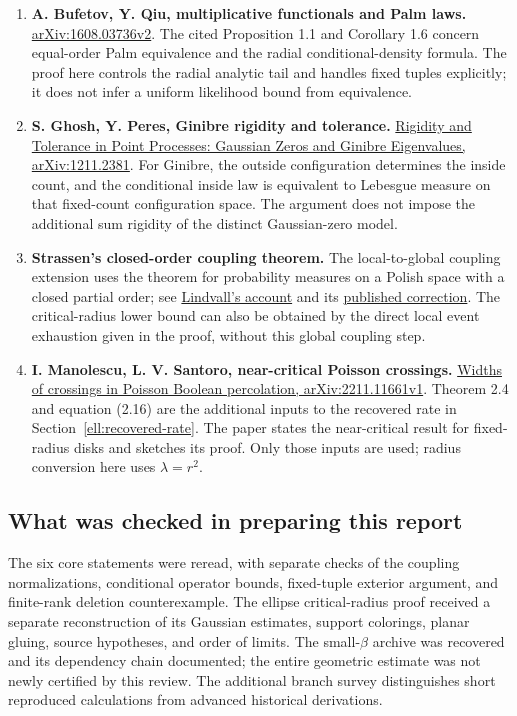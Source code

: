 \documentclass[11pt,a4paper]{article}
\theoremstyle{definition}
\theoremstyle{remark}
\numberwithin{equation}{section}
\begin{document}
\begin{enumerate}[leftmargin=*]
\item \textbf{A. Bufetov, Y. Qiu, multiplicative functionals and Palm laws.}
\href{https://arxiv.org/html/1608.03736v2}{arXiv:1608.03736v2}.
The cited Proposition 1.1 and Corollary 1.6 concern equal-order Palm
equivalence and the radial conditional-density formula. The proof here
controls the radial analytic tail and handles fixed tuples explicitly;
it does not infer a uniform likelihood bound from equivalence.

\item \textbf{S. Ghosh, Y. Peres, Ginibre rigidity and tolerance.}
\href{https://arxiv.org/abs/1211.2381}{Rigidity and Tolerance in Point
Processes: Gaussian Zeros and Ginibre Eigenvalues,
arXiv:1211.2381}.
For Ginibre, the outside configuration determines the inside count,
and the conditional inside law is equivalent to Lebesgue measure on
that fixed-count configuration space. The argument does not impose the
additional sum rigidity of the distinct Gaussian-zero model.

\item \textbf{Strassen's closed-order coupling theorem.}
The local-to-global coupling extension uses the theorem for probability
measures on a Polish space with a closed partial order; see
\href{https://www.maths.tcd.ie/EMIS/journals/EJP-ECP/article/download/1005/1005-3375-1-PB.pdf}{Lindvall's account}
and its
\href{https://www.maths.tcd.ie/EMIS/journals/EJP-ECP/article/downloadSuppFile/1005/1005-8956-1-SP.pdf}{published correction}.
The critical-radius lower bound can also be obtained by the direct local
event exhaustion given in the proof, without this global coupling step.

\item \textbf{I. Manolescu, L. V. Santoro, near-critical Poisson crossings.}
\href{https://arxiv.org/html/2211.11661v1}{Widths of crossings in
Poisson Boolean percolation, arXiv:2211.11661v1}.
Theorem 2.4 and equation (2.16) are the additional inputs to the
recovered rate in Section~\ref{ell:recovered-rate}. The paper states
the near-critical result for fixed-radius disks and sketches its proof.
Only those inputs are used; radius conversion here uses
$\lambda=r^2$.
\end{enumerate}

\subsection{What was checked in preparing this report}
The six core statements were reread, with separate checks of the coupling
normalizations, conditional operator bounds, fixed-tuple exterior argument,
and finite-rank deletion counterexample. The ellipse critical-radius proof
received a separate reconstruction of its Gaussian estimates, support
colorings, planar gluing, source hypotheses, and order of limits. The
small-\(\beta\) archive was recovered and its dependency chain documented;
the entire geometric estimate was not newly certified by this review.
The additional branch survey distinguishes short reproduced calculations
from advanced historical derivations.
\end{document}
